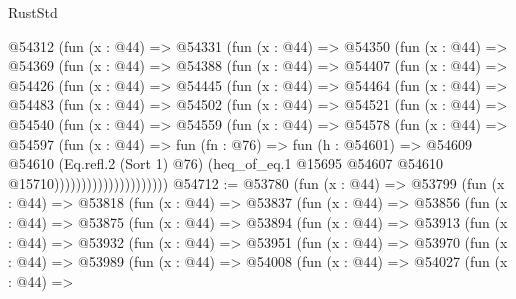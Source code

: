 \begin{lexlean}{RustStd}
\begin{coremodule}
          @54312
            (fun (x : @44) =>
            @54331
              (fun (x : @44) =>
              @54350
                (fun (x : @44) =>
                @54369
                  (fun (x : @44) =>
                  @54388
                    (fun (x : @44) =>
                    @54407
                      (fun (x : @44) =>
                      @54426
                        (fun (x : @44) =>
                        @54445
                          (fun (x : @44) =>
                          @54464
                            (fun (x : @44) =>
                            @54483
                              (fun (x : @44) =>
                              @54502
                                (fun (x : @44) =>
                                @54521
                                  (fun (x : @44) =>
                                  @54540
                                    (fun (x : @44) =>
                                    @54559
                                      (fun (x : @44) =>
                                      @54578
                                        (fun (x : @44) =>
                                        @54597
                                          (fun (x : @44) =>
                                          fun (fn : @76) =>
                                          fun (h : @54601) =>
                                          @54609
                                            @54610
                                            (Eq.refl.{2} (Sort 1) @76)
                                            (heq_of_eq.{1}
                                              @15695
                                              @54607
                                              @54610
                                              @15710)))))))))))))))))))))
@54712 := @53780
    (fun (x : @44) =>
    @53799
      (fun (x : @44) =>
      @53818
        (fun (x : @44) =>
        @53837
          (fun (x : @44) =>
          @53856
            (fun (x : @44) =>
            @53875
              (fun (x : @44) =>
              @53894
                (fun (x : @44) =>
                @53913
                  (fun (x : @44) =>
                  @53932
                    (fun (x : @44) =>
                    @53951
                      (fun (x : @44) =>
                      @53970
                        (fun (x : @44) =>
                        @53989
                          (fun (x : @44) =>
                          @54008
                            (fun (x : @44) =>
                            @54027
                              (fun (x : @44) =>

\end{coremodule}
\end{lexlean}

